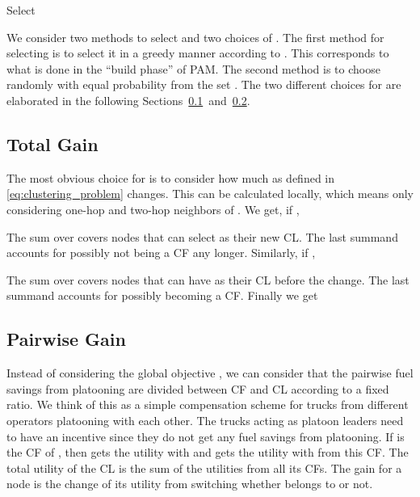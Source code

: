 \documentclass[letterpaper,10pt,conference,twocolumn]{IEEEtran}
\theoremstyle{definition}
\begin{document}
\begin{algorithm}
\begin{algorithmic}
\Require 
\Ensure 

\State 
\While{}
  \State Select 
    \If {}
      \State 
    \Else
      \State 
    \EndIf
\EndWhile
\end{algorithmic}
\caption{}\label{alg:general_alg}
\end{algorithm}

We consider two methods to select  and two choices of .
The first method for selecting  is to select it in a greedy manner according to . This corresponds to what is done in the ``build phase'' of PAM. The second method is to choose  randomly with equal probability from the set . The two different choices for  are elaborated in the following Sections~\ref{sec:central_objective}~and~\ref{sec:individual_objective}.

\subsection{Total Gain}
\label{sec:central_objective}

The most obvious choice for  is to consider how much  as defined in \eqref{eq:clustering_problem} changes. This can be calculated locally, which means only considering one-hop and two-hop neighbors of . We get, if ,

The sum over  covers nodes that can select  as their new CL. The last summand accounts for  possibly not being a CF any longer.
Similarly, if ,

The sum over  covers nodes that can have  as their CL before the change. The last summand accounts for  possibly becoming a CF. Finally we get


\subsection{Pairwise Gain}
\label{sec:individual_objective}

Instead of considering the global objective , we can consider that the pairwise fuel savings from platooning are divided between CF and CL according to a fixed ratio. We think of this as a simple compensation scheme for trucks from different operators platooning with each other. The trucks acting as platoon leaders need to have an incentive since they do not get any fuel savings from platooning. If  is the CF of , then  gets the utility  with  and  gets the utility  with  from this CF. The total utility of the CL is the sum of the utilities from all its CFs. The gain  for a node  is the change of its utility from switching whether  belongs to  or not. 
\end{document}
